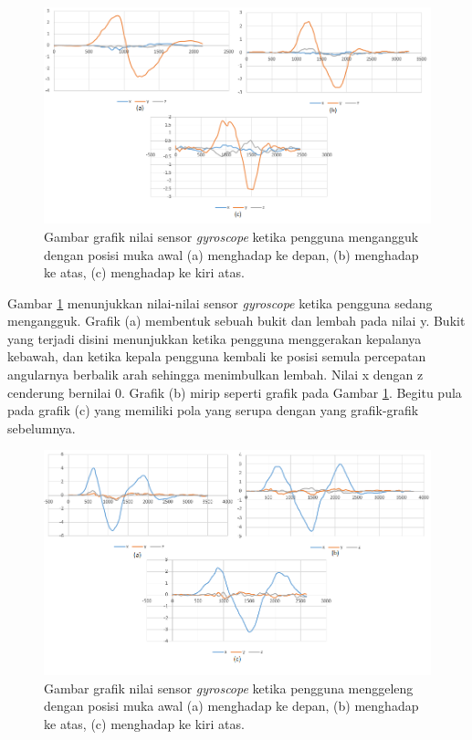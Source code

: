 \begin{figure}[htbp]
\centering
\includegraphics[scale=0.6]{Gambar/grafik-sensor-gyroscope-mengangguk.png}
\caption{Gambar grafik nilai sensor \textit{gyroscope} ketika pengguna mengangguk dengan posisi muka awal (a) menghadap ke depan, (b) menghadap ke atas, (c) menghadap ke kiri atas.}
\label{fig:grafik-sensor-gyroscope-mengangguk}
\end{figure}
Gambar \ref{fig:grafik-sensor-gyroscope-mengangguk} menunjukkan nilai-nilai sensor \textit{gyroscope} ketika pengguna sedang mengangguk. Grafik (a) membentuk sebuah bukit dan lembah pada nilai y. Bukit yang terjadi disini menunjukkan ketika pengguna menggerakan kepalanya kebawah, dan ketika kepala pengguna kembali ke posisi semula percepatan angularnya berbalik arah sehingga menimbulkan lembah. Nilai x dengan z cenderung bernilai 0. Grafik (b) mirip seperti grafik pada Gambar \ref{fig:grafik-sensor-gyroscope-mengangguk}. Begitu pula pada grafik (c) yang memiliki pola yang serupa dengan yang grafik-grafik sebelumnya.

\begin{figure}[htbp]
\centering
\includegraphics[scale=0.6]{Gambar/grafik-sensor-gyroscope-menggeleng.png}
\caption{Gambar grafik nilai sensor \textit{gyroscope} ketika pengguna menggeleng dengan posisi muka awal (a) menghadap ke depan, (b) menghadap ke atas, (c) menghadap ke kiri atas.} 
\label{fig:grafik-sensor-gyroscope-menggeleng}
\end{figure}

